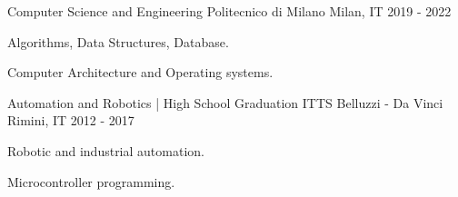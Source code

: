 

\begin{cventries}

  \cventry
    {Computer Science and Engineering} %
    {Politecnico di Milano} %
    {Milan, IT} %
    {2019 - 2022} %
    {
      \begin{cvitems} %
        \item {Algorithms, Data Structures, Database.}
        \item {Computer Architecture and Operating systems.}
      \end{cvitems}
    }
    
  \cventry
    {Automation and Robotics | High School Graduation} %
    {ITTS Belluzzi - Da Vinci} %
    {Rimini, IT} %
    {2012 - 2017} %
    {
      \begin{cvitems} %
        \item {Robotic and industrial automation.}
        \item {Microcontroller programming.}
      \end{cvitems}
    }

\end{cventries}
